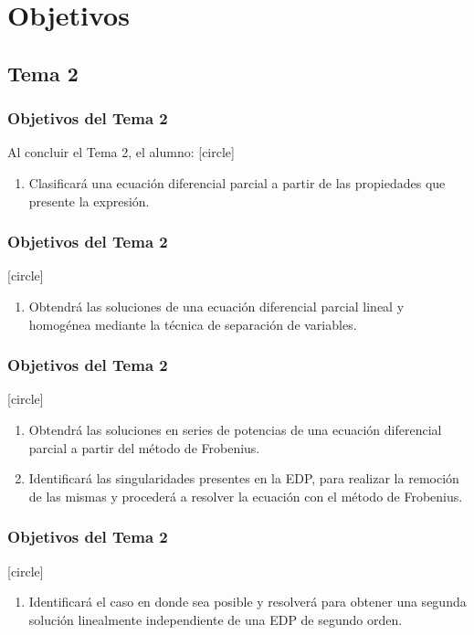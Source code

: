 \documentclass[12pt]{beamer}
\begin{document}
\section{Objetivos}
\subsection{Tema 2}

\begin{frame}
\frametitle{Objetivos del Tema 2}
Al concluir el Tema 2, el alumno:
[circle]
\begin{enumerate}
\item Clasificará una ecuación diferencial parcial a partir de las propiedades que presente la expresión.
\seti
\end{enumerate}
\end{frame}
\begin{frame}
\frametitle{Objetivos del Tema 2}
[circle]
\begin{enumerate}
\conti
\item Obtendrá las soluciones de una ecuación diferencial parcial lineal y homogénea mediante la técnica de separación de variables.
\seti
\end{enumerate}
\end{frame}
\begin{frame}
\frametitle{Objetivos del Tema 2}
[circle]
\begin{enumerate}
\conti
\item Obtendrá las soluciones en series de potencias de una ecuación diferencial parcial a partir del método de Frobenius.
\item Identificará las singularidades presentes en la EDP, para realizar la remoción de las mismas y procederá a resolver la ecuación con el método de Frobenius.
\seti
\end{enumerate}
\end{frame}
\begin{frame}
\frametitle{Objetivos del Tema 2}
[circle]
\begin{enumerate}
\conti
\item Identificará el caso en donde sea posible y resolverá para obtener una segunda solución linealmente independiente de una EDP de segundo orden.
\seti
\end{enumerate}
\end{frame}
\end{document}
